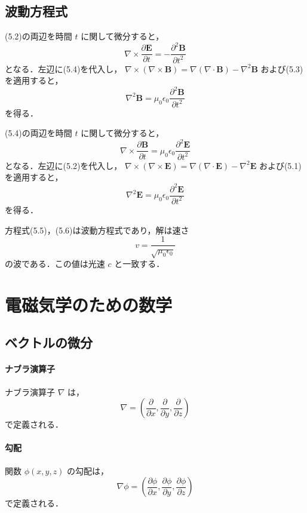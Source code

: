 \documentclass[11pt, a4paper]{ltjsarticle}
\numberwithin{equation}{section}
\begin{document}
\subsection{波動方程式}
(5.2)の両辺を時間 $t$ に関して微分すると，
\[
  \nabla \times \frac{\partial \bm{E}}{\partial t} = - \frac{\partial^{2} \bm{B}}{\partial t^{2}}
\]
となる．左辺に(5.4)を代入し，
$\nabla \times \left( \nabla \times \bm{B} \right) = \nabla \left( \nabla \cdot \bm{B} \right) - \nabla^{2} \bm{B}$ および(5.3)を適用すると，
\begin{equation}
  \nabla^{2} \bm{B} = \mu_0 \epsilon_0 \frac{\partial^{2} \bm{B}}{\partial t^{2}}
\end{equation}
を得る．

(5.4)の両辺を時間 $t$ に関して微分すると，
\[
  \nabla \times \frac{\partial \bm{B}}{\partial t} = \mu_0 \epsilon_0 \frac{\partial^{2} \bm{E}}{\partial t^{2}}
\]
となる．左辺に(5.2)を代入し，
$\nabla \times \left( \nabla \times \bm{E} \right) = \nabla \left( \nabla \cdot \bm{E} \right) - \nabla^{2} \bm{E}$ および(5.1)を適用すると，
\begin{equation}
  \nabla^{2} \bm{E} = \mu_0 \epsilon_0 \frac{\partial^{2} \bm{E}}{\partial t^{2}}
\end{equation}
を得る．

方程式(5.5)，(5.6)は波動方程式であり，解は速さ
\[
  v = \frac{1}{\sqrt{\mu_0 \epsilon_0}}
\]
の波である．この値は光速 $c$ と一致する．

\appendix
\section{電磁気学のための数学}
\subsection{ベクトルの微分}
\paragraph{ナブラ演算子}
ナブラ演算子 $\nabla$ は，
\[
  \nabla = \left( \frac{\partial}{\partial x}, \frac{\partial}{\partial y}, \frac{\partial}{\partial z} \right)
\]
で定義される．
\paragraph{勾配}
関数 $\phi \left(x, y, z \right)$ の勾配は，
\[
  \nabla \phi = \left( \frac{\partial \phi}{\partial x}, \frac{\partial \phi}{\partial y}, \frac{\partial \phi}{\partial z} \right)
\]
で定義される．
\end{document}
